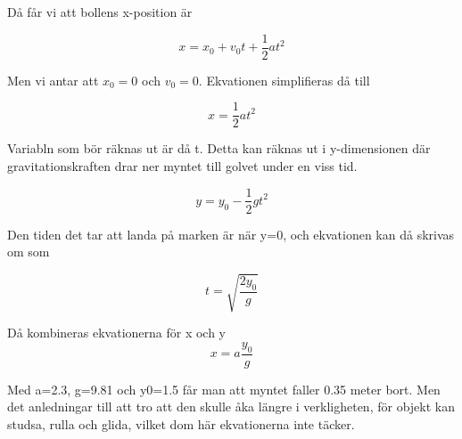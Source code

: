 \documentclass[a4paper,12pt]{article}
\begin{document}
\begin{enumerate}
    Då får vi att bollens x-position är

    $$x=x_0+v_0t+\frac{1}{2}at^2$$

    Men vi antar att $x_0=0$ och $v_0=0$. 
    Ekvationen simplifieras då till

    $$x=\frac{1}{2}at^2$$
    
    Variabln som bör räknas ut är då t. Detta 
    kan räknas ut i y-dimensionen där gravitationskraften
    drar ner myntet till golvet under en viss tid.

    $$y=y_0-\frac{1}{2}gt^2$$
    
    Den tiden det tar att landa på marken är när y=0,
    och ekvationen kan då skrivas om som

    $$t=\sqrt{\frac{2y_0}{g}}$$ 

    Då kombineras ekvationerna för x och y
    $$x=a\frac{y_0}{g}$$

    Med a=2.3, g=9.81 och y0=1.5 får man att 
    myntet faller 0.35 meter bort. Men det anledningar
    till att tro att den skulle åka längre i verkligheten, för
    objekt kan studsa, rulla och glida, vilket dom här 
    ekvationerna inte täcker. 

\end{enumerate}
\end{document}
